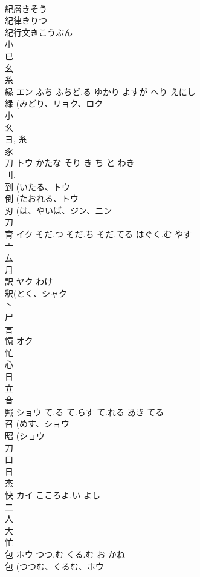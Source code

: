 \documentclass[8pt]{extreport}
\begin{document}
\begin{CJK}{UTF8}{min}
\\	紀層きそう
\\	紀律きりつ
\\	紀行文きこうぶん
\\	小 
\\	已 
\\	幺 
\\	糸 
\\	縁	エン	ふち ふちど.る ゆかり よすが へり えにし	
\\	緑 (みどり、リョク、ロク 
\\	小 
\\	幺 
\\	ヨ, 糸 
\\	豕 
\\	刀	トウ	かたな そり き ち と わき	
\\	刂. 
\\	到 (いたる、トウ 
\\	倒 (たおれる、トウ 
\\	刃 (は、やいば、ジン、ニン 
\\	刀 
\\	育	イク	そだ.つ そだ.ち そだ.てる はぐく.む やす	
\\	亠 
\\	厶 
\\	月 
\\	訳	ヤク	わけ	
\\	釈(とく、シャク 
\\	丶 
\\	尸 
\\	言 
\\	憶	オク		
\\	忙 
\\	心 
\\	日 
\\	立 
\\	音 
\\	照	ショウ	て.る て.らす て.れる あき てる	
\\	召 (めす、ショウ 
\\	昭 (ショウ 
\\	刀 
\\	口 
\\	日 
\\	杰	
\\	快	カイ	こころよ.い よし	
\\	二 
\\	人 
\\	大 
\\	忙 
\\	包	ホウ	つつ.む くる.む お かね	
\\	包 (つつむ、くるむ、ホウ 

\end{CJK}
\end{document}
